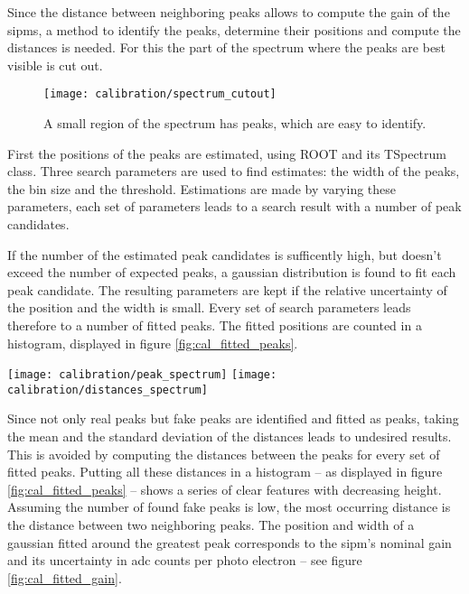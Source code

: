 Since the distance between neighboring peaks allows to compute the gain of the \glspl{sipm}, a method to identify the peaks, determine their positions and compute the distances is needed.
For this the part of the spectrum where the peaks are best visible is cut out.
\begin{figure}
  \centering
  \texttt{[image: calibration/spectrum\_cutout]}
  \caption{%
    A small region of the spectrum has peaks, which are easy to identify.
  }
  \label{fig:spectrum_for_fit}
\end{figure}

First the positions of the peaks are estimated, using ROOT\cite{cern:root} and its TSpectrum class\cite{ROOT:TSpectrum}.
Three search parameters are used to find estimates: the width of the peaks, the bin size and the threshold.
Estimations are made by varying these parameters, each set of parameters leads to a search result with a number of peak candidates.

If the number of the estimated peak candidates is sufficently high, but doesn't exceed the number of expected peaks, a gaussian distribution is found to fit each peak candidate.
The resulting parameters are kept if the relative uncertainty of the position and the width is small.
Every set of search parameters leads therefore to a number of fitted peaks.
The fitted positions are counted in a histogram, displayed in figure \ref{fig:cal_fitted_peaks}.

\begin{figure*}
  \centering
  \texttt{[image: calibration/peak\_spectrum]}
  \texttt{[image: calibration/distances\_spectrum]}
  \caption{%
    The plot on the left shows the peak positions found for the given spectrum and different search parameters.
    The occurrences between the maxima show, that the search and fit method finds and registers fake peaks as well.
    The plot on the right displays the computed spectrum of distances.
    The first peak is the distance between two neigboring peaks.
    The second peak is the distance to the next proximate peaks, etc.
  }
  \label{fig:cal_fitted_peaks}
\end{figure*}

Since not only real peaks but fake peaks are identified and fitted as peaks, taking the mean and the standard deviation of the distances leads to undesired results.
This is avoided by computing the distances between the peaks for every set of fitted peaks.
Putting all these distances in a histogram -- as displayed in figure \ref{fig:cal_fitted_peaks} -- shows a series of clear features with decreasing height.
Assuming the number of found fake peaks is low, the most occurring distance is the distance between two neighboring peaks.
The position and width of a gaussian fitted around the greatest peak corresponds to the \gls{sipm}'s nominal gain and its uncertainty in \gls{adc} counts per photo electron -- see figure \ref{fig:cal_fitted_gain}.

